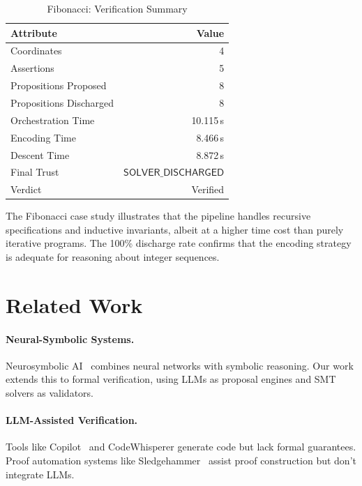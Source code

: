 \documentclass[11pt]{article}
\newcommand{\SolverDisch}{\ensuremath{\mathsf{SOLVER\_DISCHARGED}}}
\begin{document}
\begin{table}[H]
\centering
\caption{Fibonacci: Verification Summary}
\label{tab:fib-summary}
\begin{tabular}{lr}
\toprule
\textbf{Attribute} & \textbf{Value} \\
\midrule
Coordinates & 4 \\
Assertions & 5 \\
Propositions Proposed & 8 \\
Propositions Discharged & 8 \\
Orchestration Time & 10.115\,s \\
Encoding Time & 8.466\,s \\
Descent Time & 8.872\,s \\
Final Trust & \SolverDisch \\
Verdict & Verified \\
\bottomrule
\end{tabular}
\end{table}

The Fibonacci case study illustrates that the pipeline handles recursive
specifications and inductive invariants, albeit at a higher time cost
than purely iterative programs.  The 100\% discharge rate confirms that
the encoding strategy is adequate for reasoning about integer sequences.

\section{Related Work}\label{sec:related}

\paragraph{Neural-Symbolic Systems.}
Neurosymbolic AI~\cite{Garcez2019} combines neural networks with symbolic 
reasoning. Our work extends this to formal verification, using LLMs as 
proposal engines and SMT solvers as validators.

\paragraph{LLM-Assisted Verification.}
Tools like Copilot~\cite{Copilot2021} and CodeWhisperer generate code but 
lack formal guarantees. Proof automation systems like 
Sledgehammer~\cite{Sledgehammer} assist proof construction but don't integrate 
LLMs.
\end{document}
